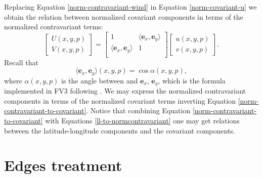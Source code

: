 Replacing Equation \eqref{norm-contravariant-wind} in 
Equation \eqref{norm-covariant-u} we obtain
the relation between normalized covariant components in terms of the
normalized contravariant terms:
\begin{equation}
	\label{norm-contravariant-to-covariant}
	\begin{bmatrix}
		{U}(x,y,p) \\
		{V}(x,y,p)
	\end{bmatrix}
	=
	\begin{bmatrix}
		1 
		& \langle 	\boldsymbol{e}_x, \boldsymbol{e}_y \rangle \\
		\langle 	\boldsymbol{e}_x, \boldsymbol{e}_y \rangle 
		& 1\\
	\end{bmatrix}
	\begin{bmatrix}
		{u} (x,y,p) \\
		{v} (x,y,p) 
	\end{bmatrix}.
\end{equation}
Recall that
\begin{equation}
\langle 	\boldsymbol{e}_x, \boldsymbol{e}_y \rangle(x,y,p) = \cos \alpha(x,y,p),
\end{equation}
where $\alpha(x,y,p)$ is the angle between and 	$\boldsymbol{e}_x$, $\boldsymbol{e}_y$, which
is the formula implemented in FV3 following \citet{putman:2007}.
We may express the normalized contravariant components in terms of 
the normalized covariant terms inverting Equation \eqref{norm-contravariant-to-covariant}.
Notice that combining Equation \eqref{norm-contravariant-to-covariant} with Equations
\eqref{ll-to-normcontravariant}
one may get relations between the latitude-longitude 
components and the covariant components.


\section{Edges treatment}
\label{cs-halodata}

